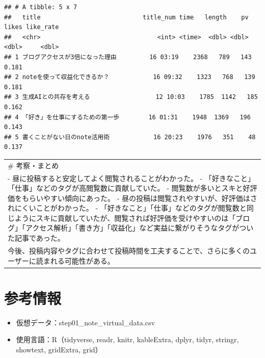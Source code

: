 \documentclass[
]{article}
\providecommand{\tightlist}{%
  \setlength{\itemsep}{0pt}\setlength{\parskip}{0pt}}
\begin{document}
\begin{verbatim}
## # A tibble: 5 x 7
##   title                            title_num time   length    pv likes like_rate
##   <chr>                                <int> <time>  <dbl> <dbl> <dbl>     <dbl>
## 1 ブログアクセスが3倍になった理由         16 03:19    2368   789   143     0.181
## 2 noteを使って収益化できるか？            16 09:32    1323   768   139     0.181
## 3 生成AIとの共存を考える                  12 10:03    1785  1142   185     0.162
## 4 「好き」を仕事にするための第一歩        16 01:31    1948  1369   196     0.143
## 5 書くことがない日のnote活用術            16 20:23    1976   351    48     0.137
\end{verbatim}

\begin{longtable}[]{@{}
  >{\raggedright\arraybackslash}p{}@{}}
\toprule\noalign{}
\endhead
\bottomrule\noalign{}
\endlastfoot
\# 考察・まとめ \\
- 昼に投稿すると安定してよく閲覧されることがわかった。 -
「好きなこと」「仕事」などのタグが高閲覧数に貢献していた。 -
閲覧数が多いとスキと好評価をもらいやすい傾向にあった。 -
昼の投稿は閲覧されやすいが、好評価はされにくいことがわかった。 -
「好きなこと」「仕事」などのタグが閲覧数と同じようにスキに貢献していたが、閲覧されば好評価を受けやすいのは「ブログ」「アクセス解析」「書き方」「収益化」など実益に繋がりそうなタグがついた記事であった。 \\
今後、投稿内容やタグに合わせて投稿時間を工夫することで、さらに多くのユーザーに読まれる可能性がある。 \\
\end{longtable}

\section{参考情報}\label{ux53c2ux8003ux60c5ux5831}

\begin{itemize}
\tightlist
\item
  仮想データ：step01\_note\_virtual\_data.csv
\item
  使用言語：R（tidyverse, readr, knitr, kableExtra, dplyr, tidyr,
  stringr, showtext, gridExtra, grid）
\end{itemize}
\end{document}
